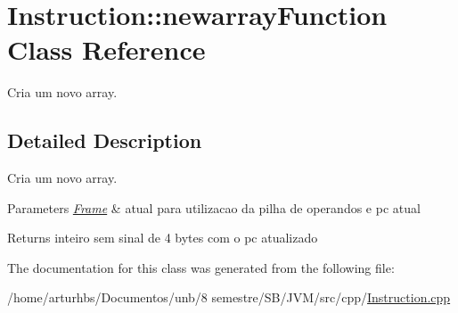 \hypertarget{classInstruction_1_1newarrayFunction}{}\section{Instruction\+:\+:newarray\+Function Class Reference}
\label{classInstruction_1_1newarrayFunction}


Cria um novo array.  




\subsection{Detailed Description}
Cria um novo array. 


\begin{DoxyParams}{Parameters}
{\em \hyperlink{classFrame}{Frame}} & atual para utilizacao da pilha de operandos e pc atual \\
\hline
\end{DoxyParams}
\begin{DoxyReturn}{Returns}
inteiro sem sinal de 4 bytes com o pc atualizado 
\end{DoxyReturn}


The documentation for this class was generated from the following file\+:\begin{DoxyCompactItemize}
\item 
/home/arturhbs/\+Documentos/unb/8 semestre/\+S\+B/\+J\+V\+M/src/cpp/\hyperlink{Instruction_8cpp}{Instruction.\+cpp}\end{DoxyCompactItemize}
